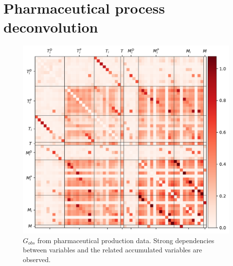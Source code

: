 \documentclass[../Thesis.tex]{subfiles}
\begin{document}
\section{Pharmaceutical process deconvolution}
\begin{figure}[ht]
    \centering
    \includegraphics[width = 1\linewidth]{figures/Cycle data/G_obs complete - symmetric.pdf}
    \caption{$G_{obs}$ from pharmaceutical production data. Strong dependencies between variables and the related accumulated variables are observed.}
    \label{fig:Cycle data - G_obs all}
\end{figure}
\end{document}
